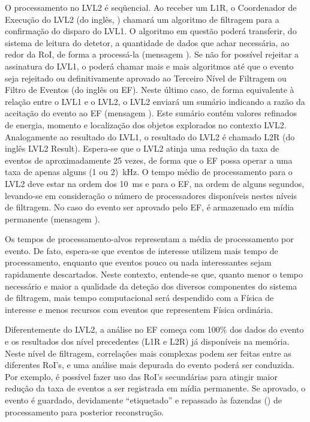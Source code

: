 O processamento no LVL2 é seqüencial. Ao receber um L1R, o Coordenador de
Execução do LVL2 (do inglês, ) chamará um algoritmo de filtragem
para a confirmação do disparo do LVL1. O algoritmo em questão poderá
transferir, do sistema de leitura do detetor, a quantidade de dados que achar
necessária, ao redor da RoI, de forma a processá-la (mensagem ). Se
não for possível rejeitar a assinatura do LVL1, o  poderá chamar
mais e mais algoritmos até que o evento seja rejeitado ou definitivamente
aprovado ao Terceiro Nível de Filtragem ou Filtro de Eventos (do inglês
 ou EF). Neste último caso, de forma equivalente à relação
entre o LVL1 e o LVL2, o LVL2 enviará um sumário indicando a razão da
aceitação do evento ao EF (mensagem ). Este sumário contém valores
refinados de energia, momento e localização dos objetos explorados no contexto
LVL2. Analogamente ao resultado do LVL1, o resultado do LVL2 é chamado L2R (do
inglês {LVL2 Result}). Espera-se que o LVL2 atinja uma redução da taxa de
eventos de aproximadamente 25 vezes, de forma que o EF possa operar a uma taxa
de apenas alguns (1 ou 2)~kHz. O tempo médio de processamento para o LVL2 deve
estar na ordem dos 10~ms e para o EF, na ordem de alguns segundos, levando-se
em consideração o número de processadores disponíveis nestes níveis de
filtragem. No caso do evento ser aprovado pelo EF, é armazenado em mídia
permanente (mensagem
).

Os tempos de processamento-alvos representam a média de processamento por
evento. De fato, espera-se que eventos de interesse utilizem mais tempo de
processamento, enquanto que eventos pouco ou nada interessantes sejam
rapidamente descartados. Neste contexto, entende-se que, quanto menor o tempo
necessário e maior a qualidade da deteção dos diversos componentes do sistema
de filtragem, mais tempo computacional será despendido com a Física de
interesse e menos recursos com eventos que representem Física ordinária.

Diferentemente do LVL2, a análise no EF começa com 100\% dos dados do evento e
os resultados dos nível precedentes (L1R e L2R) já disponíveis na
memória. Neste nível de filtragem, correlações mais complexas podem ser feitas
entre as diferentes RoI's, e uma análise mais depurada do evento poderá ser
conduzida. Por exemplo, é possível fazer uso das RoI's secundárias para
atingir maior redução da taxa de eventos a ser registrada em mídia
permanente. Se aprovado, o evento é guardado, devidamente ``etiquetado'' e
repassado às fazendas () de processamento  para
posterior reconstrução.

